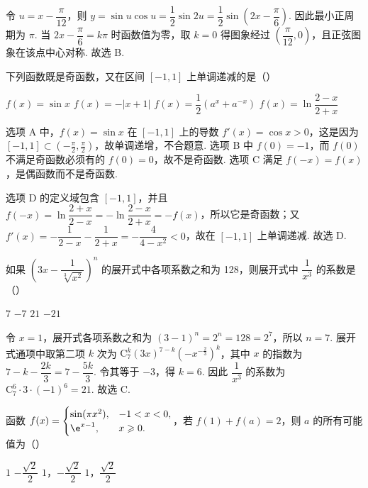 \begin{solution}
令 \(u=x-\dfrac{\pi}{12}\)，则
\(y=\sin u\cos u=\dfrac{1}{2}\sin 2u=\dfrac{1}{2}\sin\left(2x-\dfrac{\pi}{6}\right)\). 因此最小正周期为 \(\pi\). 当 \(2x-\dfrac{\pi}{6}=k\pi\) 时函数值为零，取 \(k=0\) 得图象经过 \(\left(\dfrac{\pi}{12},0\right)\)，且正弦图象在该点中心对称. 故选 B.
\end{solution}

\begin{problem}
下列函数既是奇函数，又在区间 \([-1,1]\) 上单调递减的是（\quad）

\choices
    {\(f(x)=\sin x\)}
    {\(f(x)=-|x+1|\)}
    {\(f(x)=\dfrac{1}{2}(a^x+a^{-x})\)}
    {\(f(x)=\ln\dfrac{2-x}{2+x}\)}
\end{problem}

\begin{solution}
选项 A 中，\(f(x)=\sin x\) 在 \([-1,1]\) 上的导数 \(f'(x)=\cos x>0\)，这是因为 \([-1,1]\subset(-\frac{\pi}{2},\frac{\pi}{2})\)，故单调递增，不合题意. 选项 B 中 \(f(0)=-1\)，而 \(f(0)\) 不满足奇函数必须有的 \(f(0)=0\)，故不是奇函数. 选项 C 满足 \(f(-x)=f(x)\)，是偶函数而不是奇函数.

选项 D 的定义域包含 \([-1,1]\)，并且
\(f(-x)=\ln\dfrac{2+x}{2-x}=-\ln\dfrac{2-x}{2+x}=-f(x)\)，所以它是奇函数；又
\(f'(x)=-\dfrac{1}{2-x}-\dfrac{1}{2+x}=-\dfrac{4}{4-x^2}<0\)，故在 \([-1,1]\) 上单调递减. 故选 D.
\end{solution}

\begin{problem}
如果 \(\left(3x-\dfrac{1}{\sqrt[3]{x^2}}\right)^n\) 的展开式中各项系数之和为 128，则展开式中 \(\dfrac{1}{x^3}\) 的系数是（\quad）

\choices
    {\(7\)}
    {\(-7\)}
    {\(21\)}
    {\(-21\)}
\end{problem}

\begin{solution}
令 \(x=1\)，展开式各项系数之和为 \((3-1)^n=2^n=128=2^7\)，所以 \(n=7\). 展开式通项中取第二项 \(k\) 次为
\(\mathrm C_7^k(3x)^{7-k}\left(-x^{-\frac{2}{3}}\right)^k\)，其中 \(x\) 的指数为 \(7-k-\dfrac{2k}{3}=7-\dfrac{5k}{3}\). 令其等于 \(-3\)，得 \(k=6\). 因此 \(\dfrac{1}{x^3}\) 的系数为 \(\mathrm C_7^6\cdot3\cdot(-1)^6=21\). 故选 C.
\end{solution}

\begin{problem}
函数 \(f(x)=\begin{cases}
\sin(\pi x^2), & -1<x<0,\\
\e^{x-1}, & x\geqslant 0.
\end{cases}\)，若 \(f(1)+f(a)=2\)，则 \(a\) 的所有可能值为（\quad）

\choices
    {\(1\)}
    {\(-\dfrac{\sqrt{2}}{2}\)}
    {\(1\)，\(-\dfrac{\sqrt{2}}{2}\)}
    {\(1\)，\(\dfrac{\sqrt{2}}{2}\)}
\end{problem}


